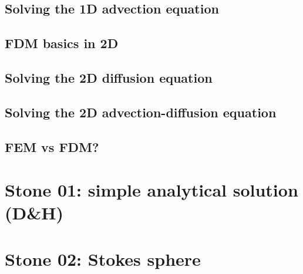 \documentclass[a4paper]{article}
\numberwithin{equation}{section}
\begin{document}
\subsection{Solving the 1D advection equation} \label{ss:fdm_adv1D} 
\newpage
\subsection{FDM basics in 2D} \label{ss:fdm_basics2D}  
\newpage
\subsection{Solving the 2D diffusion equation} \label{ss:fdm_diff2D} 
\subsection{Solving the 2D advection-diffusion equation} \label{ss:fdm_advdiff2D} 

\newpage
\subsection{FEM vs FDM?}\label{ss:femvsfdm}   




\newpage %
\section*{
Stone 01: simple analytical solution (D\&H) 
\label{f01}}

\newpage %
\section*{
Stone 02: Stokes sphere 
\label{f02}}
\end{document}
